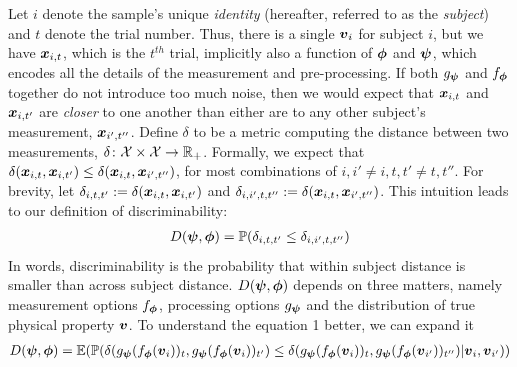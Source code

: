 \documentclass{article}
\begin{document}
Let $i$ denote the sample's unique \emph{identity} (hereafter, referred to as the \emph{subject}) and $t$ denote the trial number.  Thus, there is a single $\boldsymbol{v}_i$ for subject $i$, but we have $\boldsymbol{x}_{i,t}$, which is the $t^{th}$ trial, implicitly also a function of $\boldsymbol{\phi}$ and $\boldsymbol{\psi}$, which encodes all the details of the measurement and pre-processing. If both $g_{\boldsymbol{\psi}}$ and $f_{\boldsymbol{\phi}}$ together do not introduce too much noise, then we would expect that $\boldsymbol{x}_{i,t}$ and $\boldsymbol{x}_{i,t'}$ are \emph{closer} to one another than either are to any other subject's measurement, $\boldsymbol{x}_{i',t''}$. Define $\delta$ to be a metric computing the distance between two measurements, $\delta {\ensuremath{\colon}} \mathcal{X} \times \mathcal{X} \to \mathbb{R}_+$.  Formally, we expect that $\delta(\boldsymbol{x}_{i,t},\boldsymbol{x}_{i,t'}) \leq \delta(\boldsymbol{x}_{i,t},\boldsymbol{x}_{i',t''})$, for most combinations of $i,i'\neq i,t,t' \neq t,t''$.  
For brevity, let $\delta_{i,t,t'}:=\delta(\boldsymbol{x}_{i,t}, \boldsymbol{x}_{i,t'})$ and 
$\delta_{i,i',t,t''}:=\delta(\boldsymbol{x}_{i,t}, \boldsymbol{x}_{i',t''})$.  
This intuition leads to our definition of discriminability:
\begin{align}
	D(\boldsymbol{\psi},\boldsymbol{\phi}) = \mathbb{P}( \delta_{i,t,t'} \leq \delta_{i,i',t,t''})
\end{align}
In words, discriminability is the probability that within subject distance is smaller than across subject distance. $D(\boldsymbol{\psi},\boldsymbol{\phi})$ depends on three matters, namely measurement options $f_{\boldsymbol{\phi}}$, processing options $g_{\boldsymbol{\psi}}$ and the distribution of true physical property $\boldsymbol{v}$. To understand the equation 1 better, we can expand it
\begin{align}
	D(\boldsymbol{\psi},\boldsymbol{\phi}) = \mathbb{E}(\mathbb{P} (\delta(g_{\boldsymbol{\psi}} (f_{\boldsymbol{\phi}} (\boldsymbol{v}_i) )_t,g_{\boldsymbol{\psi}} (f_{\boldsymbol{\phi}} (\boldsymbol{v}_i) )_{t'}) \leq \delta(g_{\boldsymbol{\psi}} (f_{\boldsymbol{\phi}} (\boldsymbol{v}_i) )_t,g_{\boldsymbol{\psi}} (f_{\boldsymbol{\phi}} (\boldsymbol{v}_{i'}) )_{t''})|\boldsymbol{v}_i,\boldsymbol{v}_{i'}))
\end{align}
\end{document}
